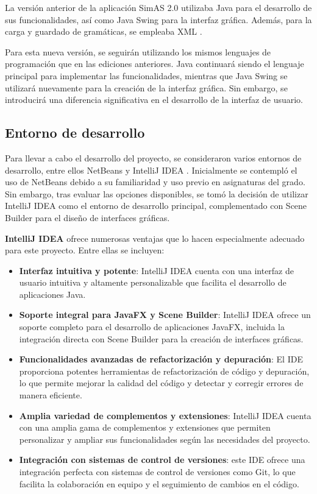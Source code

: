La versión anterior de la aplicación SimAS 2.0 \cite{juan} utilizaba Java \cite{java} para el desarrollo de sus funcionalidades, así como Java Swing \cite{javaswing} para la interfaz gráfica. Además, para la carga y guardado de gramáticas, se empleaba XML \cite{xml}. 

Para esta nueva versión, se seguirán utilizando los mismos lenguajes de programación que en las ediciones anteriores. Java continuará siendo el lenguaje principal para implementar las funcionalidades, mientras que Java Swing se utilizará nuevamente para la creación de la interfaz gráfica. Sin embargo, se introducirá una diferencia significativa en el desarrollo de la interfaz de usuario. 

\subsection{Entorno de desarrollo}

Para llevar a cabo el desarrollo del proyecto, se consideraron varios entornos de desarrollo, entre ellos NetBeans \cite{netbeans} y IntelliJ IDEA \cite{intellij}. Inicialmente se contempló el uso de NetBeans debido a su familiaridad y uso previo en asignaturas del grado. Sin embargo, tras evaluar las opciones disponibles, se tomó la decisión de utilizar IntelliJ IDEA como el entorno de desarrollo principal, complementado con Scene Builder \cite{scenebuilder} para el diseño de interfaces gráficas.

\textbf{IntelliJ IDEA} ofrece numerosas ventajas que lo hacen especialmente adecuado para este proyecto. Entre ellas se incluyen:

\begin{itemize}
    \item \textbf{Interfaz intuitiva y potente}: IntelliJ IDEA cuenta con una interfaz de usuario intuitiva y altamente personalizable que facilita el desarrollo de aplicaciones Java.
    
    \item \textbf{Soporte integral para JavaFX y Scene Builder}: IntelliJ IDEA ofrece un soporte completo para el desarrollo de aplicaciones JavaFX, incluida la integración directa con Scene Builder para la creación de interfaces gráficas.
    
    \item \textbf{Funcionalidades avanzadas de refactorización y depuración}: El IDE proporciona potentes herramientas de refactorización de código y depuración, lo que permite mejorar la calidad del código y detectar y corregir errores de manera eficiente.
    
    \item \textbf{Amplia variedad de complementos y extensiones}: IntelliJ IDEA cuenta con una amplia gama de complementos y extensiones que permiten personalizar y ampliar sus funcionalidades según las necesidades del proyecto.
    
    \item \textbf{Integración con sistemas de control de versiones}: este IDE ofrece una integración perfecta con sistemas de control de versiones como Git, lo que facilita la colaboración en equipo y el seguimiento de cambios en el código.
\end{itemize}

